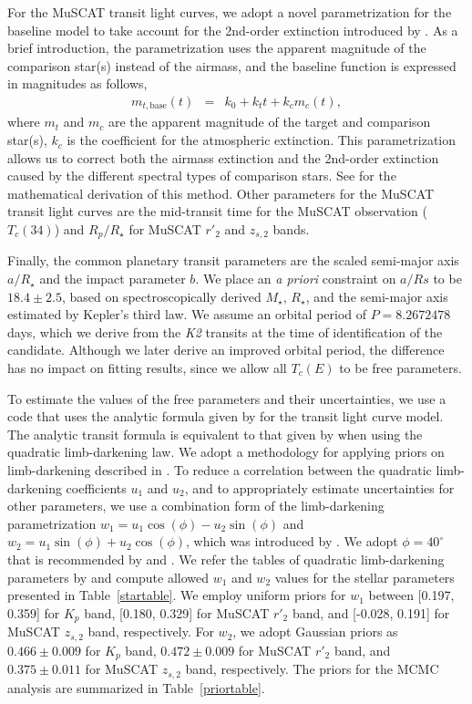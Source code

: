 \documentclass[]{pasj01}
\begin{document}
For the MuSCAT transit light curves, we adopt a novel parametrization for the baseline model
to take account for the 2nd-order extinction introduced by \citet{2016arXiv161001333F}.
As a brief introduction, the parametrization uses the apparent magnitude of
the comparison star(s) instead of the airmass,
and the baseline function is expressed in magnitudes as follows,
\begin{eqnarray*}
m_{t, \mathrm{base}} (t) &=& k_0 + k_t t + k_c m_c (t),
\end{eqnarray*}
where $m_{t}$ and $m_c$ are the apparent magnitude of the target and comparison star(s),
$k_c$ is the coefficient for the atmospheric extinction.
This parametrization allows us to correct both the airmass extinction and
the 2nd-order extinction caused by the different spectral types of comparison stars.
See \citet{2016arXiv161001333F} for the mathematical derivation of this method.
Other parameters for the MuSCAT transit light curves are
the mid-transit time for the MuSCAT observation ($T_c (34)$) and
$R_p/R_\star$ for MuSCAT $r'_2$ and $z_{s, 2}$ bands.

Finally, the common planetary transit parameters are
the scaled semi-major axis $a/R_\star$ and
the impact parameter $b$.
We place an {\it a priori} constraint on $a/Rs$ to be $18.4 \pm 2.5$,
based on spectroscopically derived $M_\star$,  $R_\star$, and
the semi-major axis estimated by Kepler's third law.
We assume an orbital period of $P = 8.2672478$ days,
which we derive from the {\it K2} transits at the time of 
identification of the candidate.
Although we later derive an improved orbital period, the difference has
no impact on fitting results, since we allow all $T_c (E)$ to be free parameters.

To estimate the values of the free parameters and their uncertainties,
we use a code \citep{2007PASJ...59..763N}
that uses the analytic formula given by \citet{2009ApJ...690....1O} for the transit light curve model.
The analytic transit formula is equivalent to that given by \citet{2002ApJ...580L.171M}
when using the quadratic limb-darkening law.
We adopt a methodology for applying priors on limb-darkening described in \citet{2016ApJ...819...27F}.
To reduce a correlation between the quadratic limb-darkening coefficients
$u_1$ and $u_2$, and to appropriately estimate uncertainties for other parameters,
we use a combination form of the limb-darkening parametrization
$w_1 = u_1 \cos (\phi) - u_2 \sin (\phi)$ and
$w_2 = u_1 \sin (\phi) + u_2 \cos (\phi)$,
which was introduced by \citet{2008MNRAS.390..281P}.
We adopt $\phi = 40^{\circ}$ that is recommended by \citet{2008MNRAS.390..281P}
and \citet{2011MNRAS.418.1165H}.
We refer the tables of quadratic limb-darkening parameters by \citet{2013A&A...552A..16C}
and compute allowed $w_1$ and $w_2$ values for the stellar parameters presented
in Table~\ref{startable}.
We employ uniform priors for $w_1$ between [0.197, 0.359] for $K_p$ band,
[0.180, 0.329] for MuSCAT $r'_2$ band,
and [-0.028, 0.191] for MuSCAT $z_{s,2}$ band, respectively.
For $w_2$, we adopt Gaussian priors as $0.466\pm0.009$ for $K_p$ band,
$0.472\pm0.009$ for MuSCAT $r'_2$ band,
and $0.375\pm0.011$ for MuSCAT $z_{s,2}$ band, respectively.
The priors for the MCMC analysis are summarized in Table~\ref{priortable}.
\end{document}
